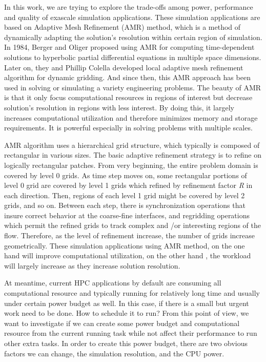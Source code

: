 \label{Section:approach}
In this work, we are trying to explore the trade-offs among  power, performance and quality of exascale simulation applications.  These simulation applications are based on Adaptive Mesh Refinement (AMR) method, which  is a method of dynamically adapting the solution's resolution within certain region of simulation. In 1984, Berger and Oliger proposed using AMR for computing time-dependent solutions to hyperbolic partial differential equations in multiple space dimensions. \cite{berger1984adaptive} Later on, they and Phillip Colella developed local adaptive mesh refinement algorithm for dynamic gridding.\cite{berger1989local} And since then, this AMR approach has been used in solving or simulating a variety engineering problems.\cite{berger1984adaptive,powell1993adaptive,bell1994three} The beauty of AMR is that it only focus computational resources in regions of interest but decrease solution's resolution in regions with less interest. By doing this, it largely increases computational utilization and therefore minimizes memory and storage requirements. It is powerful especially in solving problems with multiple scales. 

AMR algorithm uses a hierarchical grid structure, which typically is composed of rectangular in various sizes. The basic adaptive refinement strategy is to refine on logically rectangular patches. From very beginning, the entire problem domain is covered by level 0 grids. As time step moves on, some rectangular portions of level 0 grid are covered by level 1 grids which refined by refinement factor \textit{R} in each direction. Then, regions of each level 1 grid might be covered by level 2 grids, and so on. \cite{AMRalgorithms} Between each step, there is synchronization operations that insure correct behavior at the coarse-fine interfaces, and regridding operations which permit the refined grids to track complex and /or interesting regions of the flow. Therefore, as the level of refinement increase, the number of grids increase  geometrically. These simulation applications using AMR method, on the one hand will  improve computational utilization, on the other hand , the workload will largely increase as they increase solution resolution. 

At meantime, current HPC applications by default are consuming all computational resource and  typically running for relatively long time and usually under certain power budget as well. In this case, if there is a small but urgent work need to be done. How to schedule it to run? From this point of view, we want to investigate if we can create some power budget and computational resource from the current running task while not affect their performance to run other extra tasks. In order to create this power budget, there are two obvious factors we can change, the simulation resolution, and the CPU power.  

